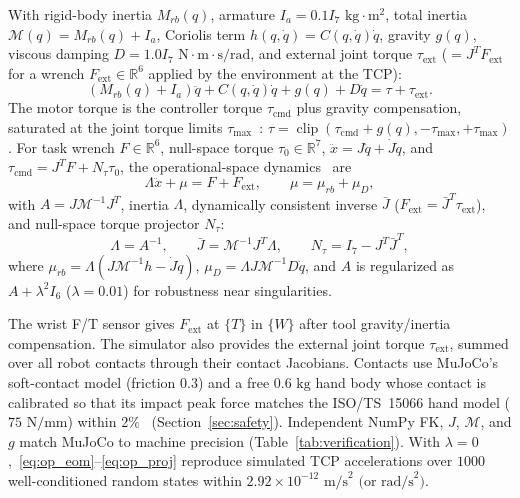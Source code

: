 With rigid-body inertia $M_{rb}(q)$, armature $I_a = 0.1 I_7\text{ kg}\cdot\text{m}^2$, total inertia $\mathcal{M}(q) = M_{rb}(q) + I_a$, Coriolis term $h(q,\dot{q}) = C(q,\dot{q})\dot{q}$, gravity $g(q)$, viscous damping $D = 1.0 I_7\text{ N}\cdot\text{m}\cdot\text{s/rad}$, and external joint torque $\tau_{\text{ext}}$ ($= J^T F_{\text{ext}}$ for a wrench $F_{\text{ext}} \in \mathbb{R}^6$ applied by the environment at the TCP):
\begin{equation}
(M_{rb}(q) + I_a)\ddot{q} + C(q,\dot{q})\dot{q} + g(q) + D\dot{q} = \tau + \tau_{\text{ext}}.
\label{eq:joint_eom}
\end{equation}
The motor torque is the controller torque $\tau_{\text{cmd}}$ plus gravity compensation, saturated at the joint torque limits $\tau_{\max}$~\cite{frankadocs}: $\tau = \operatorname{clip}(\tau_{\text{cmd}} + g(q), -\tau_{\max}, +\tau_{\max})$. For task wrench $F \in \mathbb{R}^6$, null-space torque $\tau_0 \in \mathbb{R}^7$, $\ddot{x} = J\ddot{q} + \dot{J}\dot{q}$, and $\tau_{\text{cmd}} = J^T F + N_\tau \tau_0$, the operational-space dynamics~\cite{khatib1987unified} are
\begin{equation}
\Lambda\ddot{x} + \mu = F + F_{\text{ext}}, \qquad \mu = \mu_{rb} + \mu_D,
\label{eq:op_eom}
\end{equation}
with $A = J\mathcal{M}^{-1}J^T$, inertia $\Lambda$, dynamically consistent inverse $\bar{J}$ ($F_{\text{ext}} = \bar{J}^T \tau_{\text{ext}}$), and null-space torque projector $N_\tau$:
\begin{equation}
\Lambda = A^{-1}, \qquad \bar{J} = \mathcal{M}^{-1}J^T\Lambda, \qquad N_\tau = I_7 - J^T\bar{J}^T,
\label{eq:op_proj}
\end{equation}
where $\mu_{rb} = \Lambda(J\mathcal{M}^{-1}h - \dot{J}\dot{q})$, $\mu_D = \Lambda J\mathcal{M}^{-1}D\dot{q}$, and $A$ is regularized as $A + \lambda^2 I_6$ ($\lambda = 0.01$) for robustness near singularities.

The wrist F/T sensor gives $F_{\text{ext}}$ at $\{T\}$ in $\{W\}$ after tool gravity/inertia compensation. The simulator also provides the external joint torque $\tau_{\text{ext}}$, summed over all robot contacts through their contact Jacobians. Contacts use MuJoCo's soft-contact model (friction $0.3$) and a free $0.6\text{ kg}$ hand body whose contact is calibrated so that its impact peak force matches the ISO/TS~15066 hand model ($75\text{ N/mm}$) within $2\%$~\cite{iso15066} (Section~\ref{sec:safety}). Independent NumPy FK, $J$, $\mathcal{M}$, and $g$ match MuJoCo to machine precision (Table~\ref{tab:verification}). With $\lambda = 0$,~\eqref{eq:op_eom}--\eqref{eq:op_proj} reproduce simulated TCP accelerations over $1000$ well-conditioned random states within $2.92\times 10^{-12}\text{ m/s}^2\text{ (or rad/s}^2\text{)}$.

\begin{table}[t]
\centering
\caption{Model verification against MuJoCo and finite differences (max error over 1000 random states)}
\label{tab:verification}

\end{table}
